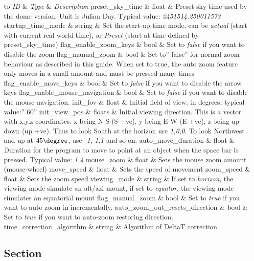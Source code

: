 \begin{longtabu} to \textwidth {l|l|X}
\toprule
\emph{ID} & \emph{Type} & \emph{Description}\tabularnewline
\midrule
preset\_sky\_time & float & Preset sky time used by the
dome version. Unit is Julian Day. Typical value:
\emph{2451514.250011573}\tabularnewline
\midrule
startup\_time\_mode & string & Set the start-up time mode,
can be \emph{actual} (start with current real world time), or
\emph{Preset} (start at time defined by
preset\_sky\_time)\tabularnewline
\midrule
flag\_enable\_zoom\_keys & bool & Set to \emph{false} if
you want to disable the zoom\tabularnewline
\midrule
flag\_manual\_zoom & bool & Set to'' false'' for normal
zoom behaviour as described in this guide. When set to true, the auto
zoom feature only moves in a small amount and must be pressed many
times\tabularnewline
\midrule
flag\_enable\_move\_keys & bool & Set to \emph{false} if
you want to disable the arrow keys\tabularnewline
\midrule
flag\_enable\_mouse\_navigation & bool & Set to
\emph{false} if you want to disable the mouse navigation.\tabularnewline
\midrule
init\_fov & float & Initial field of view, in degrees,
typical value:'' 60''\tabularnewline
\midrule
init\_view\_pos & floats & Initial viewing direction. This
is a vector with x,y,z-coordinates. x being N-S (S +ve), y being E-W (E
+ve), z being up-down (up +ve). Thus to look South at the horizon use
\emph{1,0,0}. To look Northwest and up at $45\degree$, use \emph{-1,-1,1} and so
on.\tabularnewline
\midrule
auto\_move\_duration & float & Duration for the program to
move to point at an object when the space bar is pressed. Typical value:
\emph{1.4}\tabularnewline
\midrule
mouse\_zoom & float & Sets the mouse zoom amount
(mouse-wheel)\tabularnewline
\midrule
move\_speed & float & Sets the speed of
movement\tabularnewline
\midrule
zoom\_speed & float & Sets the zoom speed\tabularnewline
\midrule
viewing\_mode & string & If set to \emph{horizon}, the
viewing mode simulate an alt/azi mount, if set to \emph{equator}, the
viewing mode simulates an equatorial mount\tabularnewline
\midrule
flag\_manual\_zoom & bool & Set to \emph{true} if you want
to auto-zoom in incrementally.\tabularnewline
\midrule
auto\_zoom\_out\_resets\_direction & bool & Set to
\emph{true} if you want to auto-zoom restoring direction.\tabularnewline
\midrule
time\_correction\_algorithm & string & Algorithm of DeltaT
correction.\tabularnewline
\bottomrule
\end{longtabu}

\subsection{Section
}\label{section-plugins-load-at-startup}

